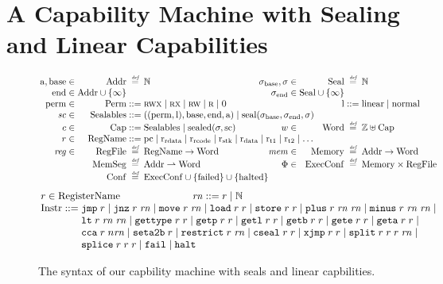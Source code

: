 \documentclass[acmsmall,review,anonymous]{acmart}\settopmatter{printfolios=true,printccs=false,printacmref=false}
\renewcommand{\MemSeg}{\shareddom{MemSeg}}
\renewcommand{\Reg}{\shareddom{RegFile}}
\renewcommand{\RegName}{\shareddom{RegName}}
\renewcommand{\SealableCaps}{\shareddom{Sealables}}
\renewcommand{\rretc}{\mathrm{r}_{\mathrm{rcode}}}
\renewcommand{\rretd}{\mathrm{r}_{\mathrm{rdata}}}
\begin{document}
\section{A Capability Machine with Sealing and Linear Capabilities}
\label{sec:cap-mach-w-seal-and-lin}
\begin{figure}[tb]
  \centering
  \[
  \arraycolsep=1.4pt
  \begin{array}{rrcl l rrcl}
   \addrbnf,\basebnf \in & \Addr & \defeq & \nats & \phantom{mak} & \sealbasebnf, \sigma \in & \Seal & \defeq & \nats\\
    \aendbnf \in & \Addr \cup \{\infty \} & & & & \sealendbnf \in & \Seal \cup \{\infty \}& &\\
    \permbnf \in& \Perm & \defbnf & \rwx \mid \rx \mid \rw \mid \ro \mid \noperm & & &\linbnf & \defbnf & \linear \mid \normal\\
    \vsc \in &\SealableCaps&\defbnf & \multicolumn{6}{l}{((\permbnf,\linbnf),\basebnf,\aendbnf,\addrbnf) \mid \seal{\sealbasebnf,\sealendbnf,\sigma}}\\
    c \in&\Caps& \defbnf &  \SealableCaps \mid \sealed{\sigma,\scbnf} & & w \in &\Word & \defeq & \ints \uplus \Caps\\ 
    r \in& \RegName & \defbnf & \multicolumn{6}{l}{\pcreg \mid \rretd \mid \rretc \mid \rstk \mid \rdata \mid \rtmp{1} \mid \rtmp{2} \mid \dots} \\
    \reg \in &\Reg & \defeq & \RegName \fun \Word & & \mem \in&\Mem & \defeq & \Addr \fun \Word\\
    &\MemSeg & \defeq & \Addr \parfun \Word & & \Phi \in & \ExecConf & \defeq & \Mem \times \Reg\\
    &\Conf & \defeq & \multicolumn{6}{l}{\ExecConf \cup \{\failed\} \cup \{\halted\} }
  \end{array}
\]
\[
  \arraycolsep=1.4pt
\begin{array}{rcl}
\multicolumn{3}{l}{    \arraycolsep=0pt
      \com{r} \in  \tRegName \hspace{2.5cm}   \com{\rn} \defbnf \com{r} \mid \nats
}\\
  \Instr &\defbnf & \tjmp{\com{r}} \mid \tjnz{\com{r}}{\com{\rn}} \mid \tmove{\com{r}}{\com{\rn}} \mid \tload{\com{r}}{\com{r}} \mid \tstore{\com{r}}{\com{r}} \mid \tplus{\com{r}}{\com{\rn}}{\com{\rn}} \mid \tminus{\com{r}}{\com{\rn}}{\com{\rn}} \mid\\
         & & \tlt{\com{r}}{\com{\rn}}{\com{\rn}} \mid \tisptr{\com{r}}{\com{r}} \mid\tgetp{\com{r}}{\com{r}} \mid \tgetlin{\com{r}}{\com{r}} \mid \tgetb{\com{r}}{\com{r}} \mid \tgete{\com{r}}{\com{r}} \mid \tgeta{\com{r}}{\com{r}}  \mid \\
  & & \tcca{\com{r}}{\com{n\rn}} \mid \tsetatob{\com{r}} \mid \trestrict{\com{r}}{\com{\rn}} \mid \tcseal{\com{r}}{\com{r}} \mid \txjmp{\com{r}}{\com{r}} \mid  \tsplit{\com{r}}{\com{r}}{\com{r}}{\com{\rn}} \mid\\ 
      & & \tsplice{\com{r}}{\com{r}}{\com{r}} \mid \tfail \mid \thalt 
\end{array}
\]
  \caption{The syntax of our capbility machine with seals and linear capbilities.}
  \label{fig:target-syntax}
\end{figure}
\end{document}
